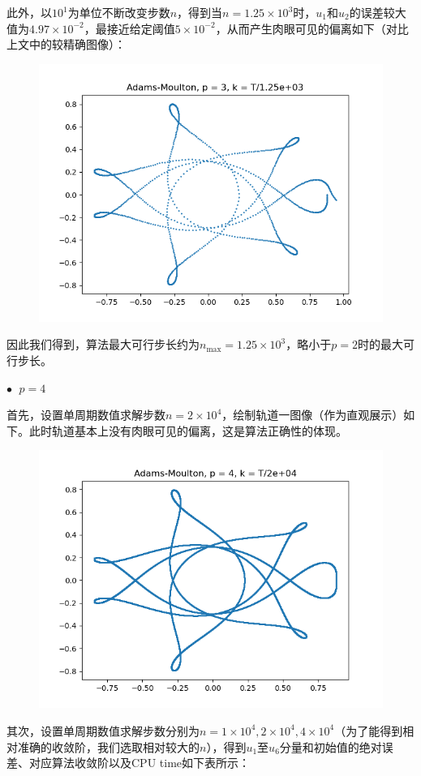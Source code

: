 \documentclass{ctexart}
\begin{document}
\begin{sloppypar}
此外，以$10^1$为单位不断改变步数$n$，得到当$n = 1.25 \times 10^3$时，$u_1$和$u_2$的误差较大值为$4.97 \times 10^{-2}$，最接近给定阈值$5 \times 10^{-2}$，从而产生肉眼可见的偏离如下（对比上文中的较精确图像）：
\begin{figure}[H]
\centering
\includegraphics[scale = 0.45]{./report_src/Figure_51.png}
\end{figure}
因此我们得到，算法最大可行步长约为$n_{\max} = 1.25 \times 10^3$，略小于$p=2$时的最大可行步长。

$\bullet \;$ $p = 4$

首先，设置单周期数值求解步数$n = 2 \times 10^4$，绘制轨道一图像（作为直观展示）如下。此时轨道基本上没有肉眼可见的偏离，这是算法正确性的体现。
\begin{figure}[H]
\centering
\includegraphics[scale = 0.45]{./report_src/Figure_52.png}
\end{figure}
其次，设置单周期数值求解步数分别为$n = 1 \times 10^4,2 \times 10^4, 4 \times 10^4$（为了能得到相对准确的收敛阶，我们选取相对较大的$n$），得到$u_1$至$u_6$分量和初始值的绝对误差、对应算法收敛阶以及CPU time如下表所示：


\end{sloppypar}
\end{document}
